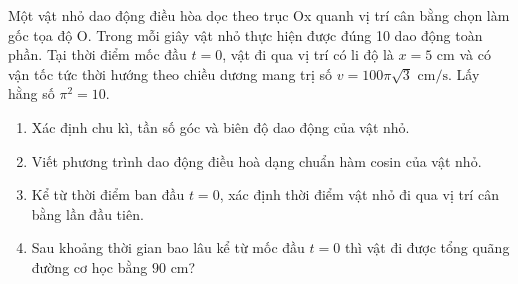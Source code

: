 \begin{ex}[{(2 điểm)}]\label{TL1}
	Một vật nhỏ dao động điều hòa dọc theo trục Ox quanh vị trí cân bằng chọn làm gốc tọa độ O. Trong mỗi giây vật nhỏ thực hiện được đúng 10 dao động toàn phần. Tại thời điểm mốc đầu $t=0$, vật đi qua vị trí có li độ là $x=5\text{ cm}$ và có vận tốc tức thời hướng theo chiều dương mang trị số $v=100\pi\sqrt{3}\text{ cm/s}$. Lấy hằng số $\pi^{2}=10$.
	\begin{enumerate}
		\item[a)] Xác định chu kì, tần số góc và biên độ dao động của vật nhỏ.
		\item[b)] Viết phương trình dao động điều hoà dạng chuẩn hàm cosin của vật nhỏ.
		\item[c)] Kể từ thời điểm ban đầu $t=0$, xác định thời điểm vật nhỏ đi qua vị trí cân bằng lần đầu tiên.
		\item[d)] Sau khoảng thời gian bao lâu kể từ mốc đầu $t=0$ thì vật đi được tổng quãng đường cơ học bằng $90\text{ cm}$?
	\end{enumerate}
\end{ex}
